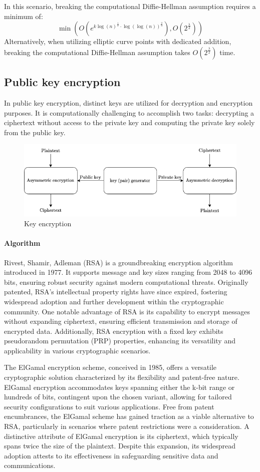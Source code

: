 In this scenario, breaking the computational Diffie-Hellman assumption requires a minimum of:
\[\min \left( O\left( e^{k\log(n)^{\frac{1}{3}}\cdot\log(\log(n))^{\frac{2}{3}}}\right), O\left(2^\frac{\lambda}{2}\right)\right)\]
Alternatively, when utilizing elliptic curve points with dedicated addition, breaking the computational Diffie-Hellman assumption takes $O\left(2^\frac{\lambda}{2}\right)$ time. 

\subsection{Public key encryption}
In public key encryption, distinct keys are utilized for decryption and encryption purposes. 
It is computationally challenging to accomplish two tasks: decrypting a ciphertext without access to the private key and computing the private key solely from the public key.
\begin{figure}[H]
    \centering
    \includegraphics[width=0.75\linewidth]{images/ke.png}
    \caption{Key encryption}
\end{figure}

\paragraph*{Algorithm}
Rivest, Shamir, Adleman (RSA) is a groundbreaking encryption algorithm introduced in 1977. 
It supports message and key sizes ranging from 2048 to 4096 bits, ensuring robust security against modern computational threats.
Originally patented, RSA's intellectual property rights have since expired, fostering widespread adoption and further development within the cryptographic community.
One notable advantage of RSA is its capability to encrypt messages without expanding ciphertext, ensuring efficient transmission and storage of encrypted data.
Additionally, RSA encryption with a fixed key exhibits pseudorandom permutation (PRP) properties, enhancing its versatility and applicability in various cryptographic scenarios.

The ElGamal encryption scheme, conceived in 1985, offers a versatile cryptographic solution characterized by its flexibility and patent-free nature.
ElGamal encryption accommodates keys spanning either the k-bit range or hundreds of bits, contingent upon the chosen variant, allowing for tailored security configurations to suit various applications.
Free from patent encumbrances, the ElGamal scheme has gained traction as a viable alternative to RSA, particularly in scenarios where patent restrictions were a consideration.
A distinctive attribute of ElGamal encryption is its ciphertext, which typically spans twice the size of the plaintext. 
Despite this expansion, its widespread adoption attests to its effectiveness in safeguarding sensitive data and communications.


